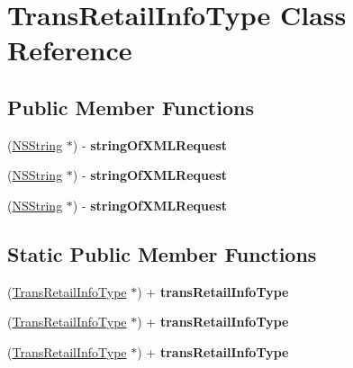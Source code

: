 \hypertarget{interface_trans_retail_info_type}{
\section{TransRetailInfoType Class Reference}
\label{interface_trans_retail_info_type}
}
\subsection*{Public Member Functions}
\begin{DoxyCompactItemize}
\item 
\hypertarget{interface_trans_retail_info_type_ada4055372fbee355dedf3be1fbe125c4}{
(\hyperlink{class_n_s_string}{NSString} $\ast$) -\/ {\bfseries stringOfXMLRequest}}
\label{interface_trans_retail_info_type_ada4055372fbee355dedf3be1fbe125c4}

\item 
\hypertarget{interface_trans_retail_info_type_ada4055372fbee355dedf3be1fbe125c4}{
(\hyperlink{class_n_s_string}{NSString} $\ast$) -\/ {\bfseries stringOfXMLRequest}}
\label{interface_trans_retail_info_type_ada4055372fbee355dedf3be1fbe125c4}

\item 
\hypertarget{interface_trans_retail_info_type_ada4055372fbee355dedf3be1fbe125c4}{
(\hyperlink{class_n_s_string}{NSString} $\ast$) -\/ {\bfseries stringOfXMLRequest}}
\label{interface_trans_retail_info_type_ada4055372fbee355dedf3be1fbe125c4}

\end{DoxyCompactItemize}
\subsection*{Static Public Member Functions}
\begin{DoxyCompactItemize}
\item 
\hypertarget{interface_trans_retail_info_type_af7e2f0988b7ddbb4c50936e5394cc473}{
(\hyperlink{interface_trans_retail_info_type}{TransRetailInfoType} $\ast$) + {\bfseries transRetailInfoType}}
\label{interface_trans_retail_info_type_af7e2f0988b7ddbb4c50936e5394cc473}

\item 
\hypertarget{interface_trans_retail_info_type_af7e2f0988b7ddbb4c50936e5394cc473}{
(\hyperlink{interface_trans_retail_info_type}{TransRetailInfoType} $\ast$) + {\bfseries transRetailInfoType}}
\label{interface_trans_retail_info_type_af7e2f0988b7ddbb4c50936e5394cc473}

\item 
\hypertarget{interface_trans_retail_info_type_af7e2f0988b7ddbb4c50936e5394cc473}{
(\hyperlink{interface_trans_retail_info_type}{TransRetailInfoType} $\ast$) + {\bfseries transRetailInfoType}}
\label{interface_trans_retail_info_type_af7e2f0988b7ddbb4c50936e5394cc473}

\end{DoxyCompactItemize}
